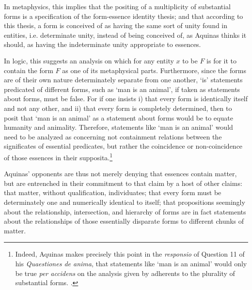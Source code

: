 \documentclass[]{article}
\begin{document}
In metaphysics, this implies that the positing of a multiplicity of substantial forms is a specification of the form-essence identity thesis; and that according to this thesis, a form is conceived of as having the same sort of unity found in entities, i.e. determinate unity, instead of being conceived of, as Aquinas thinks it should, as having the indeterminate unity appropriate to essences.
	
In logic, this suggests an analysis on which for any entity $x$ to be $F$ is for it to contain the form $F$ as one of its metaphysical parts. Furthermore, since the forms are of their own nature determinately separate from one another, `is' statements predicated of different forms, such as `man is an animal', if taken as statements about forms, must be false. For if one insists i) that every form is identically itself and not any other, and ii) that every form is completely determined, then to posit that `man is an animal' as a statement about forms would be to equate humanity and animality. Therefore, statements like `man is an animal' would need to be analyzed as concerning not containment relations between the significates of essential predicates, but rather the coincidence or non-coincidence of those essences in their supposita.\footnote{Indeed, Aquinas makes precisely this point in the \textit{responsio} of Question 11 of his \textit{Quaestiones de anima}, that statements like `man is an animal' would only be true \textit{per accidens} on the analysis given by adherents to the plurality of substantial forms. \autocite[q. 1, a. 11, co]{AquinasDA}.}

Aquinas' opponents are thus not merely denying that essences contain matter, but are entrenched in their commitment to that claim by a host of other claims: that matter, without qualification, individuates; that every form must be determinately one and numerically identical to itself; that propositions seemingly about the relationship, intersection, and hierarchy of forms are in fact statements about the relationships of those essentially disparate forms to different chunks of matter.
\end{document}
